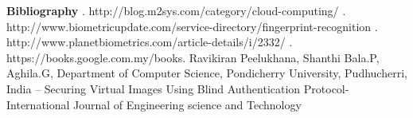 \documentclass[12pt]{article}
\begin{document}
\textbf{\large Bibliography} \newline {}.  http://blog.m2sys.com/category/cloud-computing/ \newline {}.  http://www.biometricupdate.com/service-directory/fingerprint-recognition \newline {}.  http://www.planetbiometrics.com/article-details/i/2332/ \newline {}.  https://books.google.com.my/books\newline {}.  Ravikiran Peelukhana, Shanthi Bala.P, Aghila.G, Department of       
    Computer Science, Pondicherry University, Pudhucherri, India –    
    Securing Virtual Images Using Blind Authentication Protocol-     
    International Journal of Engineering science and Technology 
\end{document}
